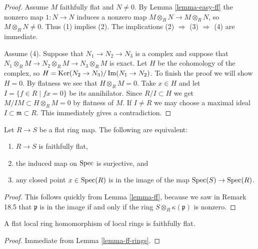 \begin{proof}
	Assume $M$ faithfully flat and $N \not = 0$. By Lemma \ref{lemma-easy-ff}
	the nonzero map $1 : N \to N$ induces a nonzero map
	$M \otimes_R N \to M \otimes_R N$, so $M \otimes_R N \not = 0$.
	Thus (1) implies (2). The implications (2) $\Rightarrow$ (3) $\Rightarrow$ (4)
	are immediate.
	
	\medskip\noindent
	Assume (4). Suppose that $N_1 \to N_2 \to N_3$ is a complex and
	suppose that $N_1 \otimes_R M \to N_2\otimes_R M \to
	N_3\otimes_R M$ is exact. Let $H$ be the cohomology of the complex,
	so $H = \mathop{\mathrm{Ker}}(N_2 \to N_3)/\mathop{\mathrm{Im}}(N_1 \to N_2)$. To finish the proof
	we will show $H = 0$. By flatness we see that $H \otimes_R M = 0$.
	Take $x \in H$ and let $I = \{f \in R \mid fx = 0 \}$
	be its annihilator. Since $R/I \subset H$ we get
	$M/IM \subset H \otimes_R M = 0$ by flatness of $M$.
	If $I \not =  R$ we may choose
	a maximal ideal $I \subset \mathfrak m \subset R$.
	This immediately gives a contradiction.
\end{proof}

\begin{lemma}\cite[\href{https://stacks.math.columbia.edu/tag/00HQ}{Lemma 00HQ}]{stacks-project}
	\label{lemma-ff-rings}
	Let $R \to S$ be a flat ring map.
	The following are equivalent:
	\begin{enumerate}
		\item $R \to S$ is faithfully flat,
		\item the induced map on $\mathop{\mathrm{Spec}}$ is surjective, and
		\item any closed point $x \in \mathop{\mathrm{Spec}}(R)$ is
		in the image of the map $\mathop{\mathrm{Spec}}(S) \to \mathop{\mathrm{Spec}}(R)$.
	\end{enumerate}
\end{lemma}

\begin{proof}
	This follows quickly from Lemma \ref{lemma-ff}, because we
	saw in Remark 18.5
	that $\mathfrak p$ is in the image
	if and only if the ring $S \otimes_R \kappa(\mathfrak p)$
	is nonzero.
\end{proof}

\begin{lemma}\cite[\href{https://stacks.math.columbia.edu/tag/00HR}{Lemma 00HR}]{stacks-project}
	\label{lemma-local-flat-ff}
	A flat local ring homomorphism of local rings is faithfully flat.
\end{lemma}

\begin{proof}
	Immediate from Lemma \ref{lemma-ff-rings}.
\end{proof}

